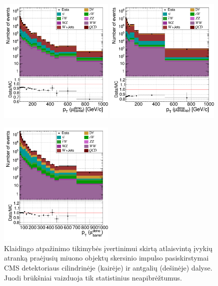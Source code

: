 \documentclass[a4paper, 12pt, oneside]{article}
\begin{document}
\begin{figure}[t!]
	\RawFloats
	\includegraphics[width=0.49\textwidth]{Magistrinis/pT_mu_barrel.png}
	\includegraphics[width=0.49\textwidth]{Magistrinis/pT_mu_endcap.png}
	\caption{\label{fig:FRpT_mu}
		Klaidingo atpažinimo tikimybės įvertinimui skirtą atlaisvintą įvykių atranką praėjusių miuono objektų skersinio
		impulso pasiskirstymai CMS detektoriaus cilindrinėje (kairėje) ir antgalių (dešinėje) dalyse.
		Juodi brūkšniai vaizduoja tik statistinius neapibrėžtumus.}
	\vspace{1cm}
	\includegraphics[width=0.49\textwidth]{Magistrinis/pT_mu_barrel_FIT.png}

\end{figure}
\end{document}
